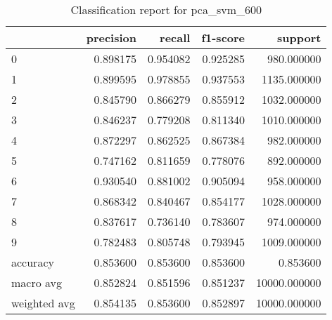 \begin{table}[htb!]
\centering
\caption{Classification report for pca_svm_600}
\label{tab:classification-report-pca_svm_600}
\begin{tabular}{lrrrr}
\toprule
 & precision & recall & f1-score & support \\
\midrule
0 & 0.898175 & 0.954082 & 0.925285 & 980.000000 \\
1 & 0.899595 & 0.978855 & 0.937553 & 1135.000000 \\
2 & 0.845790 & 0.866279 & 0.855912 & 1032.000000 \\
3 & 0.846237 & 0.779208 & 0.811340 & 1010.000000 \\
4 & 0.872297 & 0.862525 & 0.867384 & 982.000000 \\
5 & 0.747162 & 0.811659 & 0.778076 & 892.000000 \\
6 & 0.930540 & 0.881002 & 0.905094 & 958.000000 \\
7 & 0.868342 & 0.840467 & 0.854177 & 1028.000000 \\
8 & 0.837617 & 0.736140 & 0.783607 & 974.000000 \\
9 & 0.782483 & 0.805748 & 0.793945 & 1009.000000 \\
accuracy & 0.853600 & 0.853600 & 0.853600 & 0.853600 \\
macro avg & 0.852824 & 0.851596 & 0.851237 & 10000.000000 \\
weighted avg & 0.854135 & 0.853600 & 0.852897 & 10000.000000 \\
\bottomrule
\end{tabular}
\end{table}
